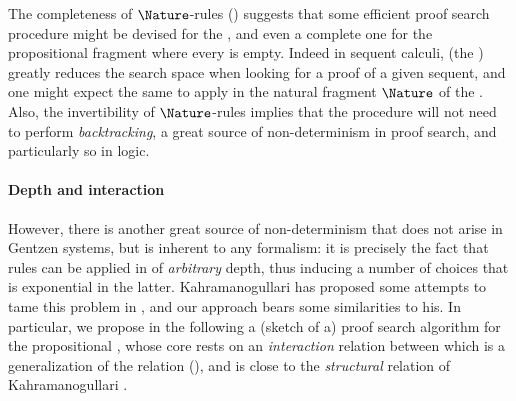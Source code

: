 \begin{scope}
The completeness of $\Nature$-rules () suggests
that some efficient proof search procedure might be devised for the , and even a complete one for the propositional fragment where every
 is empty. Indeed in sequent
calculi,  (the ) greatly reduces the
search space when looking for a proof of a given sequent, and one might expect
the same to apply in the natural fragment $\Nature$ of the .
Also, the invertibility of $\Nature$-rules implies that the procedure will not
need to perform \emph{backtracking}, a great source of non-determinism in proof
search, and particularly so in  logic.

\paragraph{Depth and interaction}

However, there is another great source of non-determinism that does not arise in
Gentzen systems, but is inherent to any  formalism: it is
precisely the fact that rules can be applied in  of \emph{arbitrary}
depth, thus inducing a number of choices that is exponential in the latter.
Kahramanogullari has proposed some attempts to tame this problem in
, and our approach bears some
similarities to his. In particular, we propose in the following a (sketch of a)
proof search algorithm for the propositional , whose core rests
on an \emph{interaction} relation between  which is a generalization of
the  relation (), and is close to the
\emph{structural} relation of Kahramanogullari
\cite[Definition~2.13]{lmcs:1089}.


\end{scope}

